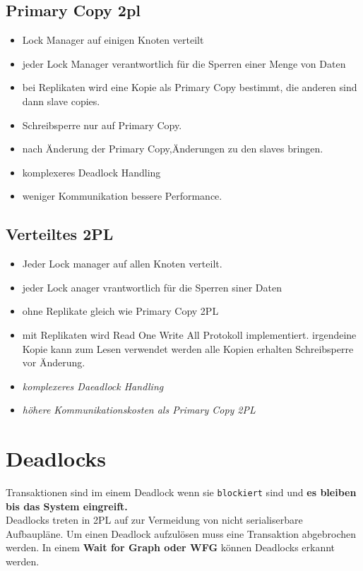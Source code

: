 \documentclass[a4paper,10pt,titlepage=false]{scrreprt}
\begin{document}
\subsection{Primary Copy 2pl} %
\label{sub:primary_copy_2pl}
\begin{itemize}

\item Lock Manager auf einigen Knoten verteilt
\item jeder Lock Manager verantwortlich für die Sperren einer Menge von Daten 
\item bei Replikaten wird eine Kopie als Primary Copy bestimmt, die anderen sind dann slave copies.
\item Schreibsperre nur auf Primary Copy.
\item nach Änderung der Primary Copy,Änderungen zu den slaves bringen.
\item komplexeres Deadlock Handling
\item weniger Kommunikation bessere Performance. 
\end{itemize}
\subsection{Verteiltes 2PL} %
\label{sub:verteiltes_2pl}
\begin{itemize}
  \item Jeder Lock manager auf allen Knoten verteilt. 
  \item jeder Lock anager vrantwortlich für die Sperren siner Daten
  \item ohne Replikate gleich wie Primary Copy 2PL
  \item mit Replikaten wird Read One Write All Protokoll implementiert. 
  \subitem irgendeine Kopie kann zum Lesen verwendet werden  
  \subitem alle Kopien erhalten Schreibsperre vor Änderung.
  \item \textit{komplexeres Daeadlock Handling}
  \item \textit{höhere Kommunikationskosten als Primary Copy 2PL}

\end{itemize}
 \section{Deadlocks} %
 \label{sec:deadlocks}
 Transaktionen sind im einem Deadlock wenn sie \texttt{blockiert} sind und \textbf{es bleiben bis das System eingreift.}\\
 Deadlocks treten in 2PL auf zur Vermeidung von nicht serialiserbare Aufbaupläne.  Um einen Deadlock aufzulösen muss eine Transaktion abgebrochen werden.
 In einem \textbf{Wait for Graph oder WFG} können Deadlocks erkannt werden.
\end{document}

